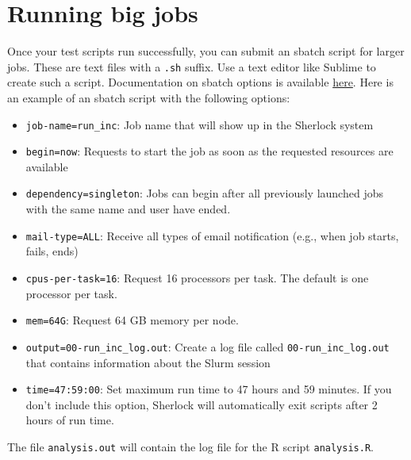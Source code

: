 \documentclass[
]{book}
\providecommand{\tightlist}{%
  \setlength{\itemsep}{0pt}\setlength{\parskip}{0pt}}
\begin{document}
\section{Running big jobs}\label{running-big-jobs-1}

Once your test scripts run successfully, you can submit an sbatch script for larger jobs. These are text files with a \texttt{.sh} suffix. Use a text editor like Sublime to create such a script. Documentation on sbatch options is available \href{https://slurm.schedmd.com/sbatch.html}{here}. Here is an example of an sbatch script with the following options:

\begin{itemize}
\tightlist
\item
  \texttt{job-name=run\_inc}: Job name that will show up in the Sherlock system
\item
  \texttt{begin=now}: Requests to start the job as soon as the requested resources are available
\item
  \texttt{dependency=singleton}: Jobs can begin after all previously launched jobs with the same name and user have ended.
\item
  \texttt{mail-type=ALL}: Receive all types of email notification (e.g., when job starts, fails, ends)
\item
  \texttt{cpus-per-task=16}: Request 16 processors per task. The default is one processor per task.
\item
  \texttt{mem=64G}: Request 64 GB memory per node.
\item
  \texttt{output=00-run\_inc\_log.out}: Create a log file called \texttt{00-run\_inc\_log.out} that contains information about the Slurm session
\item
  \texttt{time=47:59:00}: Set maximum run time to 47 hours and 59 minutes. If you don't include this option, Sherlock will automatically exit scripts after 2 hours of run time.
\end{itemize}

The file \texttt{analysis.out} will contain the log file for the R script \texttt{analysis.R}.
\end{document}
